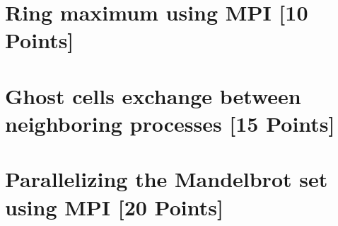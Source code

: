 \documentclass[unicode,11pt,a4paper,oneside,numbers=endperiod,openany]{scrartcl}
\begin{document}
\setassignment
{}

\newline

\assignmentpolicy


\section{Ring maximum using MPI [10 Points]}


\section{Ghost cells exchange between neighboring processes [15 Points]}


\section{Parallelizing the Mandelbrot set using MPI [20 Points]}



\end{document}
